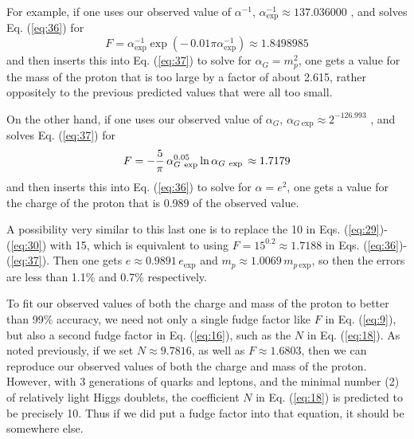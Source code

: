 \documentclass[a4paper,12pt]{article}
\begin{document}
	For example, if one uses our observed value of $\alpha^{-1}$,
$\alpha_{\mathrm{exp}}^{-1} \approx 137.036000$ \cite{PDG},
and solves Eq. (\ref{eq:36}) for
 \begin{equation}
 F = \alpha_{\mathrm{exp}}^{-1}\exp{(-\,0.01\pi\alpha_{\mathrm{exp}}^{-1})}
   \approx 1.8498985
 \label{eq:38}
 \end{equation}
and then inserts this into Eq. (\ref{eq:37})
to solve for $\alpha_G = m_p^2$,
one gets a value for the mass of the proton that
is too large by a factor of about 2.615,
rather oppositely to the previous predicted values
that were all too small.

	On the other hand, if one uses our observed value of $\alpha_G$,
$\alpha_{G\ \mathrm{exp}} \approx 2^{-126.993}$ \cite{PDG},
and solves Eq. (\ref{eq:37}) for
 \begin{equation}
 F = -{5\over\pi}\,\alpha_{G\ \mathrm{exp}}^{0.05}
      \ln{\alpha_{G\ \mathrm{exp}}}
   \, \approx 1.7179
 \label{eq:39}
 \end{equation}
and then inserts this into Eq. (\ref{eq:36})
to solve for $\alpha = e^2$,
one gets a value for the charge of the proton
that is 0.989 of the observed value.

	A possibility very similar to this last one is to
replace the 10 in Eqs. (\ref{eq:29})-(\ref{eq:30}) with 15, which is
equivalent to using $F = 15^{0.2} \approx 1.7188$ in
Eqs. (\ref{eq:36})-(\ref{eq:37}).  Then
one gets $e \approx 0.9891 \, e_{\mathrm{exp}}$
and $m_p \approx 1.0069 \, m_{p\ \mathrm{exp}}$,
so then the errors are less than 1.1\% and 0.7\% respectively.

	To fit our observed values
of both the charge and mass of the proton to better than 99\% accuracy,
we need not only a single fudge factor like $F$ in Eq. (\ref{eq:9}),
but also a second fudge factor in Eq. (\ref{eq:16}),
such as the $N$ in Eq. (\ref{eq:18}).
As noted previously, if we set $N \approx 9.7816$,
as well as $F \approx 1.6803$, then we can reproduce
our observed values of both the charge and mass of the proton.
However, with 3 generations of quarks and leptons,
and the minimal number (2) of relatively light Higgs doublets,
the coefficient $N$ in Eq. (\ref{eq:18}) is predicted to be precisely 10.
Thus if we did put a fudge factor into that equation,
it should be somewhere else.
\end{document}
